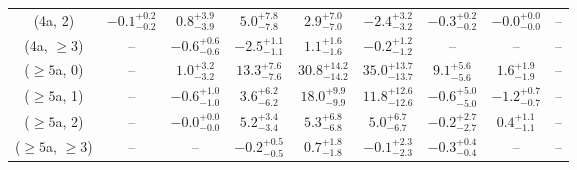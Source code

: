 \begin{table}[h!]
{\begin{tabular}{ccccccccc}
	(4a, 2) & $-0.1^{+ 0.2 }_{- 0.2 }$ & $0.8^{+ 3.9 }_{- 3.9 }$ & $5.0^{+ 7.8 }_{- 7.8 }$ & $2.9^{+ 7.0 }_{- 7.0 }$ & $-2.4^{+ 3.2 }_{- 3.2 }$ & $-0.3^{+ 0.2 }_{- 0.2 }$ & $-0.0^{+ 0.0 }_{- 0.0 }$ & -- \\[0.5ex] 
	(4a, $\ge3$) & -- & $-0.6^{+ 0.6 }_{- 0.6 }$ & $-2.5^{+ 1.1 }_{- 1.1 }$ & $1.1^{+ 1.6 }_{- 1.6 }$ & $-0.2^{+ 1.2 }_{- 1.2 }$ & -- & -- & -- \\[0.5ex] 
	($\ge5$a, 0) & -- & $1.0^{+ 3.2 }_{- 3.2 }$ & $13.3^{+ 7.6 }_{- 7.6 }$ & $30.8^{+ 14.2 }_{- 14.2 }$ & $35.0^{+ 13.7 }_{- 13.7 }$ & $9.1^{+ 5.6 }_{- 5.6 }$ & $1.6^{+ 1.9 }_{- 1.9 }$ & -- \\[0.5ex] 
	($\ge5$a, 1) & -- & $-0.6^{+ 1.0 }_{- 1.0 }$ & $3.6^{+ 6.2 }_{- 6.2 }$ & $18.0^{+ 9.9 }_{- 9.9 }$ & $11.8^{+ 12.6 }_{- 12.6 }$ & $-0.6^{+ 5.0 }_{- 5.0 }$ & $-1.2^{+ 0.7 }_{- 0.7 }$ & -- \\[0.5ex] 
	($\ge5$a, 2) & -- & $-0.0^{+ 0.0 }_{- 0.0 }$ & $5.2^{+ 3.4 }_{- 3.4 }$ & $5.3^{+ 6.8 }_{- 6.8 }$ & $5.0^{+ 6.7 }_{- 6.7 }$ & $-0.2^{+ 2.7 }_{- 2.7 }$ & $0.4^{+ 1.1 }_{- 1.1 }$ & -- \\[0.5ex] 
	($\ge5$a, $\ge3$) & -- & -- & $-0.2^{+ 0.5 }_{- 0.5 }$ & $0.7^{+ 1.8 }_{- 1.8 }$ & $-0.1^{+ 2.3 }_{- 2.3 }$ & $-0.3^{+ 0.4 }_{- 0.4 }$ & -- & -- \\[0.5ex] 
	\hline
	\hline
\end{tabular}}
\end{table}
